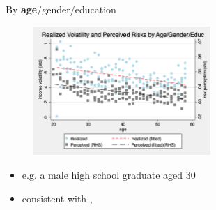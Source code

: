 \documentclass{beamer}
\begin{document}
\begin{frame}{By \textbf{age}/gender/education}
	\label{age_compare}
	\begin{figure}[ht]
		\label{compare_by_age_gender_educ}
		\centering
		\includegraphics[width=0.60\textwidth]{figures/real_log_wage_shk_gr_by_age_edu_gender_compare.png}
	\end{figure}
	\begin{itemize}
		\item e.g. a male high school graduate aged 30   \hyperlink{appendix:age_gender_educ_compare_figure}{} \quad \hyperlink{appendix:age_compare_figure}{}  
		\quad  \hyperlink{appendix:age_educ_compare_figure}{}  
		\quad  \hyperlink{appendix: compare_by_cohort}{}  
		\item consistent with  \cite{moffitt2002trends}, \cite{sabelhaus2010great}
	\end{itemize}
\end{frame}
\end{document}
